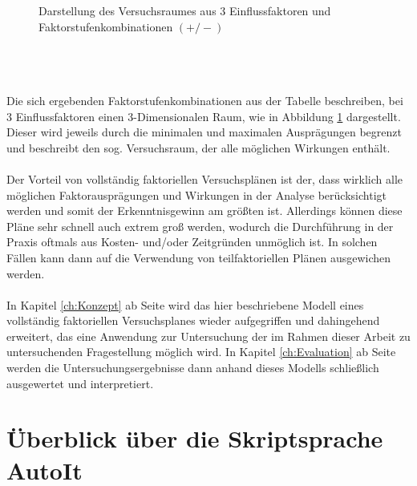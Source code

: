 \documentclass[
fontsize=10pt, 
listof = totoc,
parskip = half	
]{report}
\begin{document}
\begin{minipage}[t]{0.59\linewidth}
\begin{figure}[H]
\begin{tikzpicture}[x=0.75pt,y=0.75pt,yscale=-1,xscale=1, scale=0.6, every node/.style={scale=0.6}]
		\end{tikzpicture}
		\caption{Darstellung des Versuchsraumes aus 3 Einflussfaktoren und Faktorstufenkombinationen $(+/-)$}
		\label{fig:Versuchsplan}
	\end{figure}
\end{minipage}
\\\\\\
\noindent Die sich ergebenden Faktorstufenkombinationen aus der Tabelle beschreiben, bei 3 Einflussfaktoren einen 3-Dimensionalen Raum, wie in Abbildung \ref{fig:Versuchsplan} dargestellt. Dieser wird jeweils durch die minimalen und maximalen Ausprägungen begrenzt und beschreibt den sog. Versuchsraum, der alle möglichen Wirkungen enthält. 
\\\\
\noindent Der Vorteil von vollständig faktoriellen Versuchsplänen ist der, dass wirklich alle möglichen Faktorausprägungen und Wirkungen in der Analyse berücksichtigt werden und somit der Erkenntnisgewinn am größten ist. Allerdings können diese Pläne sehr schnell auch extrem groß werden, wodurch die Durchführung in der Praxis oftmals aus Kosten- und/oder Zeitgründen unmöglich ist. In solchen  Fällen kann dann auf die Verwendung von teilfaktoriellen Plänen ausgewichen werden.
\\\\
\noindent In Kapitel \ref{ch:Konzept} ab Seite \pageref{ch:Konzept} wird das hier beschriebene Modell eines vollständig faktoriellen Versuchsplanes wieder aufgegriffen und dahingehend erweitert, das eine Anwendung zur Untersuchung der im Rahmen dieser Arbeit zu untersuchenden Fragestellung möglich wird. In Kapitel \ref{ch:Evaluation} ab Seite \pageref{ch:Evaluation} werden die Untersuchungsergebnisse dann anhand dieses Modells schließlich ausgewertet und interpretiert.

\section{Überblick über die Skriptsprache AutoIt}
\label{sec:UeberblickAutoIt}
\end{document}
